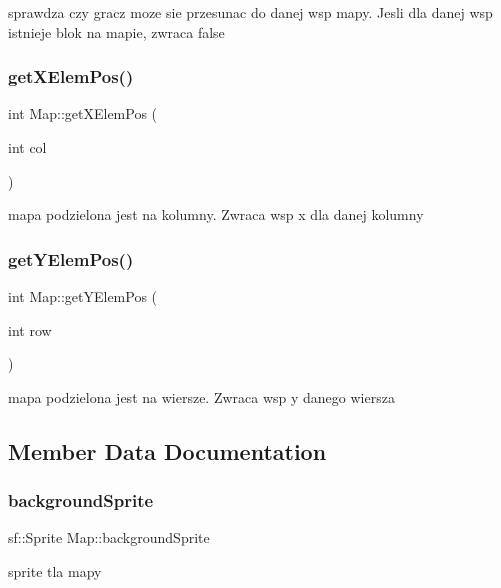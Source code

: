 sprawdza czy gracz moze sie przesunac do danej wsp mapy. Jesli dla danej wsp istnieje blok na mapie, zwraca false \mbox{\label{class_map_a46c8ba4683ce97e3f5120be02b0ace94}} 
\subsubsection{\texorpdfstring{get\+X\+Elem\+Pos()}{getXElemPos()}}
{\footnotesize\ttfamily int Map\+::get\+X\+Elem\+Pos (\begin{DoxyParamCaption}\item[{int}]{col }\end{DoxyParamCaption})}

mapa podzielona jest na kolumny. Zwraca wsp x dla danej kolumny \mbox{\label{class_map_a8efab6f1e807cb4cb576fc5dcfed3075}} 
\subsubsection{\texorpdfstring{get\+Y\+Elem\+Pos()}{getYElemPos()}}
{\footnotesize\ttfamily int Map\+::get\+Y\+Elem\+Pos (\begin{DoxyParamCaption}\item[{int}]{row }\end{DoxyParamCaption})}

mapa podzielona jest na wiersze. Zwraca wsp y danego wiersza 

\subsection{Member Data Documentation}
\mbox{\label{class_map_aa92b0ecd899641e3385613efcd037f65}} 
\subsubsection{\texorpdfstring{background\+Sprite}{backgroundSprite}}
{\footnotesize\ttfamily sf\+::\+Sprite Map\+::background\+Sprite}

sprite tla mapy \mbox{\label{class_map_a18202f9ebc5ddab14652bdacc81e3c72}} 
